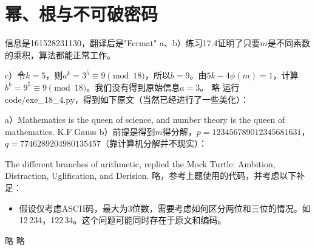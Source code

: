 \chapter{幂、根与不可破密码}
\exercise 信息是161528231130，翻译后是"Fermat"
%
\exercise a、b）练习17.4证明了只要$m$是不同素数的乘积，算法都能正常工作。\par
c）令$k=5$，则$a^k=3^5\equiv9\pmod{18}$，所以$b=9$。由$5k-4\phi(m)=1$，计算$b^k=9^5\equiv9\pmod{18}$。我们没有得到原始信息$a=3$。
%
\exercise 略
%
\exercise 运行code/exe\_18\_4.py，得到如下原文（当然已经进行了一些美化）：\par
a）Mathematics is the queen of science, and number theory is the queen of mathematics. K.F.Gauss
b）前提是得到$m$得分解，$p=123456789012345681631$，$q=7746289204980135457$（靠计算机分解并不现实）：\par
The different branches of arithmetic, replied the Mock Turtle: Ambition, Distraction, Uglification, and Derision.
%
\exercise 略，参考上题使用的代码，并考虑以下补足：
\begin{itemize}
\item 假设仅考虑ASCII码，最大为3位数，需要考虑如何区分两位和三位的情况。如12\,234，122\,34。这个问题可能同时存在于原文和编码。
\end{itemize}
%
\exercise 略
%
\exercise 略